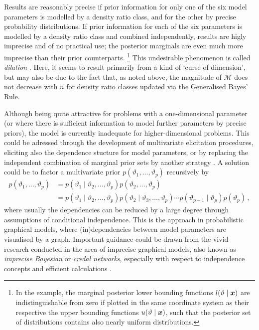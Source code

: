 Results are reasonably precise if prior information for only one of the six model parameters
is modelled by a density ratio class, and for the other by precise probability distributions.
If prior information for each of the six parameters is modelled by a density ratio class and combined independently,
results are higly imprecise and of no practical use;
the posterior marginals are even much more imprecise than their prior counterparts.%
\footnote{In the example, the marginal posterior lower bounding functions $l(\vartheta\mid{\bm x})$ are indistinguishable
from zero if plotted in the same coordinate system as their respective the upper bounding functions $u(\vartheta\mid{\bm x})$,
such that the posterior set of distributions contains also nearly uniform distributions.}
This undesirable phenomenon is called \emph{dilation} \parencite[see][]{1993:seidenfeld}.
Here, it seems to result primarily from a kind of `curse of dimension',
but may also be due to the fact that, as noted above, the magnitude of $\mathcal{M}$ does not decrease with $n$
for density ratio classes updated via the Generalised Bayes' Rule.

Although being quite attractive for problems with a one-dimensional parameter
(or where there is sufficient information to model further parameters by precise priors),
the model is currently inadequate for higher-dimensional problems.
This could be adressed through the development of multivariate elicitation procedures,
eliciting also the dependence stucture for model parameters,
or by replacing the independent combination of marginal prior sets
by another strategy \parencite[as mentioned in][\S 5.2]{2011:rinderknecht:diss}.
A solution could be to factor a multivariate prior $p(\vartheta_1,\ldots,\vartheta_p)$
recursively by
\begin{align*}
p(\vartheta_1,\ldots,\vartheta_p)
 &= p(\vartheta_1\mid \vartheta_2,\ldots,\vartheta_p) p(\vartheta_2,\ldots,\vartheta_p) \\
 &= p(\vartheta_1\mid \vartheta_2,\ldots,\vartheta_p) p(\vartheta_2\mid \vartheta_3,\ldots,\vartheta_p)
    \cdots p(\vartheta_{p-1}\mid\vartheta_p) p(\vartheta_p)\,,
\end{align*}
where usually the dependencies can be reduced by a large degree through assumptions of conditional independence.
This is the approach in probabilistic graphical models,
where (in)dependencies between model parameters are visualised by a graph.
Important guidance could be drawn from the vivid research conducted in the area
of imprecise graphical models, also known as \emph{imprecise Bayesian} or \emph{credal networks},
especially with respect to independence concepts and efficient calculations
\parencite[for a recent overview, see][]{itip-ipgms}.

